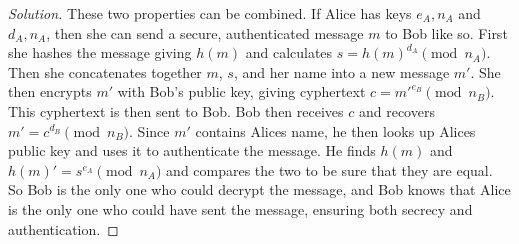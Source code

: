 \documentclass[12pt,leqno]{article}
\numberwithin{equation}{section}
\theoremstyle{definition}
\begin{document}
\begin{proof}[Solution]
These two properties can be combined.  If Alice has keys $e_A, n_A$ and $d_A, n_A$, then she can send a secure, authenticated message $m$ to Bob like so.  First she hashes the message giving $h(m)$ and calculates $s = h(m)^{d_A} \pmod{n_A}$.  Then she concatenates together $m$, $s$, and her name into a new message $m'$.  She then encrypts $m'$ with Bob's public key, giving cyphertext $c = m'^{e_B} \pmod{n_B}$.  This cyphertext is then sent to Bob.  Bob then receives $c$ and recovers $m' = c^{d_B} \pmod{n_B}$.  Since $m'$ contains Alices name, he then looks up Alices public key and uses it to authenticate the message.  He finds $h(m)$ and $h(m)' = s^{e_A} \pmod{n_A}$ and compares the two to be sure that they are equal.  So Bob is the only one who could decrypt the message, and Bob knows that Alice is the only one who could have sent the message, ensuring both secrecy and authentication.  
\end{proof}
\end{document}
